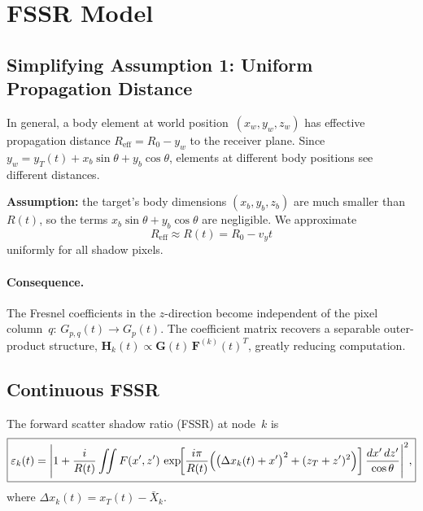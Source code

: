\documentclass[11pt,a4paper]{article}
\begin{document}
\section{FSSR Model}
\label{sec:fssr}

\subsection{Simplifying Assumption 1: Uniform Propagation Distance}
\label{sec:assumption1}

In general, a body element at world position~$(x_w,y_w,z_w)$ has
effective propagation distance $R_{\mathrm{eff}}=R_0-y_w$ to the
receiver plane.  Since $y_w=y_T(t)+x_b\sin\theta+y_b\cos\theta$,
elements at different body positions see different distances.

\textbf{Assumption:} the target's body dimensions $(x_b,y_b,z_b)$
are much smaller than~$R(t)$, so the terms
$x_b\sin\theta+y_b\cos\theta$ are negligible.  We approximate
\begin{equation}
  \boxed{R_{\mathrm{eff}} \approx R(t) = R_0 - v_y t}
  \label{eq:Reff_approx}
\end{equation}
uniformly for all shadow pixels.

\paragraph{Consequence.}
The Fresnel coefficients in the $z$-direction become independent of
the pixel column~$q$: $G_{p,q}(t)\to G_p(t)$.  The coefficient
matrix recovers a separable outer-product structure,
$\mathbf{H}_k(t)\propto\mathbf{G}(t)\,\mathbf{F}^{(k)}(t)^T$,
greatly reducing computation.

\subsection{Continuous FSSR}

The forward scatter shadow ratio (FSSR) at node~$k$ is
\begin{equation}
  \boxed{
  \varepsilon_k(t) = \Biggl|1
  + \frac{i}{R(t)}\iint F(x',z')\,
  \exp\!\biggl[\frac{i\pi}{R(t)}\Bigl(
  \bigl(\Delta x_k(t)+x'\bigr)^2
  + (z_T+z')^2\Bigr)\biggr]
  \,\frac{dx'\,dz'}{\cos\theta}\Biggr|^2,}
  \label{eq:fssr_continuous}
\end{equation}
where $\Delta x_k(t)=x_T(t)-\bar{X}_k$.
\end{document}
